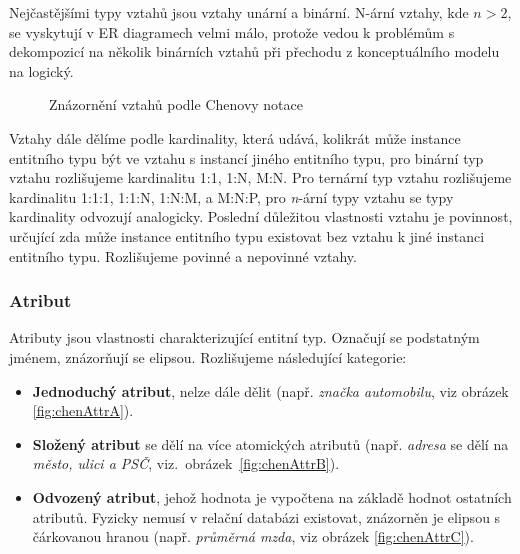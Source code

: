 \documentclass[czech,bachelor,public,dept460,male,oneside]{diploma}
\begin{document}
		Nejčastějšími typy vztahů jsou vztahy unární a binární. N-ární vztahy, kde $n > 2$, se vyskytují v ER diagramech velmi málo, protože vedou k problémům s dekompozicí na několik binárních vztahů při přechodu z konceptuálního modelu na logický.
		
		\begin{figure}[!h]
			\centering
			\caption[Znázornění vztahů podle Chenovy notace]{Znázornění vztahů podle Chenovy notace}
		\end{figure}
	
		Vztahy dále dělíme podle kardinality, která udává, kolikrát může instance entitního typu být ve vztahu s instancí jiného entitního typu, pro binární typ vztahu  rozlišujeme kardinalitu 1:1, 1:N, M:N. Pro ternární typ vztahu rozlišujeme kardinalitu 1:1:1, 1:1:N, 1:N:M, a M:N:P, pro \textit{n}-ární typy vztahu se typy kardinality odvozují analogicky. Poslední důležitou vlastnosti vztahu je povinnost, určující zda může instance entitního typu existovat bez vztahu k jiné instanci entitního typu. Rozlišujeme povinné a nepovinné vztahy.
		
		\subsubsection{Atribut}
		Atributy jsou vlastnosti charakterizující entitní typ. Označují se podstatným jménem, znázorňují se elipsou. Rozlišujeme následující kategorie:
		
		\begin{itemize}
			\item \textbf{Jednoduchý atribut}, nelze dále dělit (např. \textit{značka automobilu}, viz obrázek \ref{fig:chenAttrA}).
			\item \textbf{Složený atribut} se dělí na více atomických atributů (např. \textit{adresa} se dělí na \textit{město, ulici a PSČ}, viz.~obrázek~\ref{fig:chenAttrB}).
			\item \textbf{Odvozený atribut}, jehož hodnota je vypočtena na základě hodnot ostatních atributů. Fyzicky nemusí v relační databázi existovat, znázorněn je elipsou s čárkovanou hranou (např. \textit{průměrná mzda}, viz obrázek \ref{fig:chenAttrC}).
		\end{itemize}
	
\end{document}
